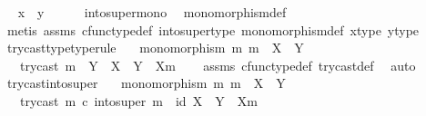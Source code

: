 \begin{isabellebody}
\ \isamarkupfalse%
\ {\isachardoublequoteopen}x\ {\isacharequal}{\kern0pt}\ y{\isachardoublequoteclose}\isanewline
\ \ \ \ \isamarkupfalse%
\ into{\isacharunderscore}{\kern0pt}super{\isacharunderscore}{\kern0pt}mono\ \isamarkupfalse%
\ monomorphism{\isacharunderscore}{\kern0pt}def\isanewline
\ \ \ \ \isamarkupfalse%
\ {\isacharparenleft}{\kern0pt}metis\ assms{\isacharparenleft}{\kern0pt}{}{\isacharparenright}{\kern0pt}\ cfunc{\isacharunderscore}{\kern0pt}type{\isacharunderscore}{\kern0pt}def\ into{\isacharunderscore}{\kern0pt}super{\isacharunderscore}{\kern0pt}type\ monomorphism{\isacharunderscore}{\kern0pt}def\ x{\isacharunderscore}{\kern0pt}type\ y{\isacharunderscore}{\kern0pt}type{\isacharparenright}{\kern0pt}\isanewline
{}\isamarkupfalse%
%
\endisatagproof
{\isafoldproof}%
%
\isadelimproof
\isanewline
%
\endisadelimproof
\isanewline
{}\isamarkupfalse%
\ try{\isacharunderscore}{\kern0pt}cast{\isacharunderscore}{\kern0pt}type{\isacharbrackleft}{\kern0pt}type{\isacharunderscore}{\kern0pt}rule{\isacharbrackright}{\kern0pt}{\isacharcolon}{\kern0pt}\isanewline
\ \ \ {\isachardoublequoteopen}monomorphism\ m{\isachardoublequoteclose}\ {\isachardoublequoteopen}m\ {\isacharcolon}{\kern0pt}\ X\ {\isasymrightarrow}\ Y{\isachardoublequoteclose}\isanewline
\ \ \ {\isachardoublequoteopen}try{\isacharunderscore}{\kern0pt}cast\ m\ {\isacharcolon}{\kern0pt}\ Y\ {\isasymrightarrow}\ X\ {\isasymCoprod}\ {\isacharparenleft}{\kern0pt}Y\ {\isasymsetminus}\ {\isacharparenleft}{\kern0pt}X{\isacharcomma}{\kern0pt}m{\isacharparenright}{\kern0pt}{\isacharparenright}{\kern0pt}{\isachardoublequoteclose}\isanewline
%
\isadelimproof
\ \ %
\endisadelimproof
%
\isatagproof
{}\isamarkupfalse%
\ assms\ cfunc{\isacharunderscore}{\kern0pt}type{\isacharunderscore}{\kern0pt}def\ try{\isacharunderscore}{\kern0pt}cast{\isacharunderscore}{\kern0pt}def{}\ \isamarkupfalse%
\ auto%
\endisatagproof
{\isafoldproof}%
%
\isadelimproof
\ \isanewline
%
\endisadelimproof
\isanewline
{}\isamarkupfalse%
\ try{\isacharunderscore}{\kern0pt}cast{\isacharunderscore}{\kern0pt}into{\isacharunderscore}{\kern0pt}super{\isacharcolon}{\kern0pt}\isanewline
\ \ \ {\isachardoublequoteopen}monomorphism\ m{\isachardoublequoteclose}\ {\isachardoublequoteopen}m\ {\isacharcolon}{\kern0pt}\ X\ {\isasymrightarrow}\ Y{\isachardoublequoteclose}\isanewline
\ \ \ {\isachardoublequoteopen}try{\isacharunderscore}{\kern0pt}cast\ m\ {\isasymcirc}\isactrlsub c\ into{\isacharunderscore}{\kern0pt}super\ m\ {\isacharequal}{\kern0pt}\ id\ {\isacharparenleft}{\kern0pt}X\ {\isasymCoprod}\ {\isacharparenleft}{\kern0pt}Y\ {\isasymsetminus}\ {\isacharparenleft}{\kern0pt}X{\isacharcomma}{\kern0pt}m{\isacharparenright}{\kern0pt}{\isacharparenright}{\kern0pt}{\isacharparenright}{\kern0pt}{\isachardoublequoteclose}\isanewline

\end{isabellebody}
